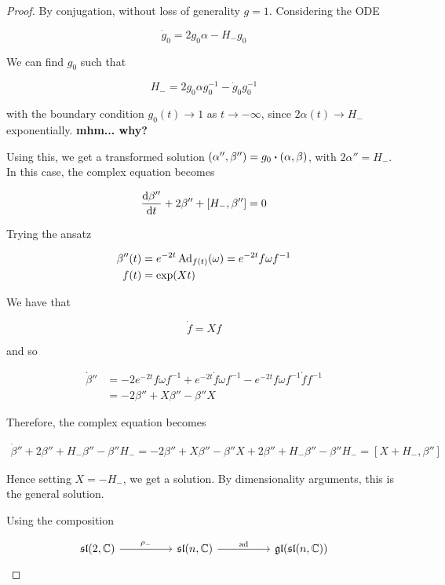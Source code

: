 \documentclass{article}
\renewcommand{\sl}{\mathfrak{sl}}
\begin{document}
\begin{proof}
    By conjugation, without loss of generality \(g = 1\). Considering the ODE

    \begin{equation*}
            \dot g_0 = 2g_0\alpha - H_-g_0
    \end{equation*}

    We can find \(g_0\) such that

    \[H_- = 2g_0\alpha g_0^{-1} - \dot g_0 g_0^{-1}\]

    with the boundary condition \(g_0(t) \to 1\) as \(t \to -\infty\), since \(2\alpha(t) \to H_-\) exponentially. \textbf{mhm... why?}

    Using this, we get a transformed solution \((\alpha'', \beta'') = g_0\vdot(\alpha,\beta)\), with \(2\alpha'' = H_-\). In this case, the complex equation becomes

    \[\dv{\beta''}{t} + 2\beta'' + [H_-, \beta''] = 0\]

    Trying the ansatz

    \begin{align*}
        \beta''(t) &= e^{-2t}\operatorname{Ad}_{f(t)}(\omega) = e^{-2t}f\omega f^{-1} \\
        f(t) &= \exp(Xt)
    \end{align*}

    We have that

    \[\dot f = Xf\]

    and so

    \begin{align*}
        \dot\beta'' &= -2e^{-2t}f\omega f^{-1} + e^{-2t}\dot f \omega f^{-1} - e^{-2t}f\omega f^{-1}\dot f f^{-1} \\
        &= -2\beta'' + X\beta'' - \beta'' X
    \end{align*}

    Therefore, the complex equation becomes

    \begin{align*}
        \dot\beta'' + 2\beta'' + H_-\beta'' - \beta''H_- = -2\beta'' + X\beta'' - \beta''X + 2\beta'' + H_-\beta'' - \beta''H_- = [X + H_-, \beta'']
    \end{align*}

    Hence setting \(X = -H_-\), we get a solution. By dimensionality arguments, this is the general solution.

    Using the composition

\[\begin{tikzcd}[ampersand replacement=\&]
	{\sl(2, \C)} \&\& {\sl(n, \C)} \&\& {\gl(\sl(n, \C))}
	\arrow["{\rho_-}", from=1-1, to=1-3]
	\arrow["\ad", from=1-3, to=1-5]
\end{tikzcd}\]


\end{proof}
\end{document}
